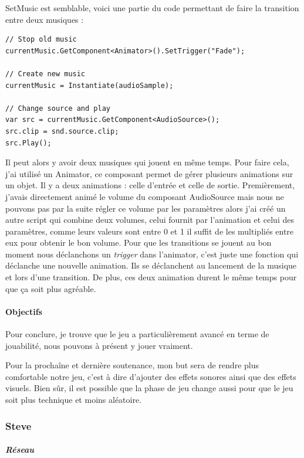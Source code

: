 \documentclass{article}
\begin{document}
SetMusic est semblable, voici une partie du code permettant de faire la transition entre deux musiques :
\begin{lstlisting}
// Stop old music
currentMusic.GetComponent<Animator>().SetTrigger("Fade");

// Create new music
currentMusic = Instantiate(audioSample);

// Change source and play
var src = currentMusic.GetComponent<AudioSource>();
src.clip = snd.source.clip;
src.Play();
\end{lstlisting}

Il peut alors y avoir deux musiques qui jouent en même temps. Pour faire cela, j'ai utilisé un Animator, ce composant permet de gérer plusieurs animations sur un objet. Il y a deux animations : celle d'entrée et celle de sortie. Premièrement, j'avais directement animé le volume du composant AudioSource mais nous ne pouvons pas par la suite régler ce volume par les paramètres alors j'ai créé un autre script qui combine deux volumes, celui fournit par l'animation et celui des paramètres, comme leurs valeurs sont entre 0 et 1 il suffit de les multipliés entre eux pour obtenir le bon volume. Pour que les transitions se jouent au bon moment nous déclanchons un \emph{trigger} dans l'animator, c'est juste une fonction qui déclanche une nouvelle animation. Ils se déclanchent au lancement de la musique et lors d'une transition. De plus, ces deux animation durent le même temps pour que ça soit plus agréable.

\paragraph{Objectifs}

Pour conclure, je trouve que le jeu a particulièrement avancé en terme de jouabilité, nous pouvons à présent y jouer vraiment.

Pour la prochaîne et dernière soutenance, mon but sera de rendre plus comfortable notre jeu, c'est à dire d'ajouter des effets sonores ainsi que des effets visuels. Bien sûr, il est possible que la phase de jeu change aussi pour que le jeu soit plus technique et moins aléatoire. 


\newpage
\subsubsection{Steve}

\subparagraph{Réseau}
\end{document}

